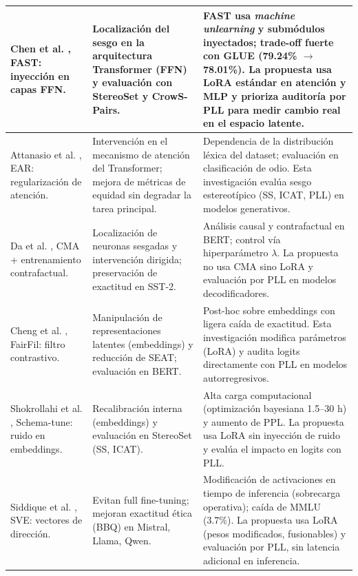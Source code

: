 \documentclass[12pt,a4paper]{report}
\begin{document}
\begin{longtable}{|P{4cm}|P{5.2cm}|P{5.2cm}|}
Chen et al. \cite{chen_identifying_2025}, FAST: inyección en capas FFN. &
Localización del sesgo en la arquitectura Transformer (FFN) y evaluación con StereoSet y CrowS-Pairs. &
FAST usa \textit{machine unlearning} y submódulos inyectados; trade-off fuerte con GLUE (79.24\% $\rightarrow$ 78.01\%). La propuesta usa LoRA estándar en atención y MLP y prioriza auditoría por PLL para medir cambio real en el espacio latente. \\
\hline

Attanasio et al. \cite{attanasio_entropy-based_2022}, EAR: regularización de atención. &
Intervención en el mecanismo de atención del Transformer; mejora de métricas de equidad sin degradar la tarea principal. &
Dependencia de la distribución léxica del dataset; evaluación en clasificación de odio. Esta investigación evalúa sesgo estereotípico (SS, ICAT, PLL) en modelos generativos. \\
\hline

Da et al. \cite{da_reducing_2024}, CMA + entrenamiento contrafactual. &
Localización de neuronas sesgadas y intervención dirigida; preservación de exactitud en SST-2. &
Análisis causal y contrafactual en BERT; control vía hiperparámetro $\lambda$. La propuesta no usa CMA sino LoRA y evaluación por PLL en modelos decodificadores. \\
\hline

Cheng et al. \cite{cheng_fairfil_2021}, FairFil: filtro contrastivo. &
Manipulación de representaciones latentes (embeddings) y reducción de SEAT; evaluación en BERT. &
Post-hoc sobre embeddings con ligera caída de exactitud. Esta investigación modifica parámetros (LoRA) y audita logits directamente con PLL en modelos autorregresivos. \\
\hline

Shokrollahi et al. \cite{shokrollahi_schema-tune_2025}, Schema-tune: ruido en embeddings. &
Recalibración interna (embeddings) y evaluación en StereoSet (SS, ICAT). &
Alta carga computacional (optimización bayesiana 1.5--30 h) y aumento de PPL. La propuesta usa LoRA sin inyección de ruido y evalúa el impacto en logits con PLL. \\
\hline

Siddique et al. \cite{siddique_shifting_2025}, SVE: vectores de dirección. &
Evitan full fine-tuning; mejoran exactitud ética (BBQ) en Mistral, Llama, Qwen. &
Modificación de activaciones en tiempo de inferencia (sobrecarga operativa); caída de MMLU (3.7\%). La propuesta usa LoRA (pesos modificados, fusionables) y evaluación por PLL, sin latencia adicional en inferencia. \\
\hline


\end{longtable}
\end{document}
